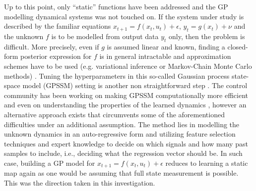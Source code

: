 Up to this point, only ``static'' functions have been addressed and the GP modelling dynamical systems was not touched on. If the system under study is described by the familiar equations $x_{t+1} = f(x_t,u_t) + \epsilon$, $y_{t} = g(x_t) + \nu$ and the unknown $f$ is to be modelled from output data $y_t$ only, then the problem is difficult.  More precisely, even if $g$ is assumed linear and known, finding a closed-form posterior expression for $f$ is in general intractable and approximation schemes have to be used (e.g. variational inference or Markov-Chain Monte Carlo methods) \citep{turner2010state}. Tuning the hyperparameters in this so-called Gaussian process state-space model (GPSSM) setting is another non straightforward step \citep{eleftheriadis2017identification}. The control community has been working on making GPSSM computationally more efficient \citep{berntorp2021online} and even on understanding the properties of the learned dynamics \citep{beckers2016stability}, however an alternative approach exists that circumvents some of the aforementioned difficulties under an additional assumption. The method lies in modelling the unknown dynamics in an auto-regressive form and utilizing feature selection techniques and expert knowledge to decide on which signals and how many past samples to include, i.e., deciding what the regression vector should be. In such case, building a GP model for $x_{t+1} = f(x_t,u_t) + \epsilon$ reduces to learning a static map again as one would be assuming that full state measurement is possible. This was the direction taken in this investigation.

